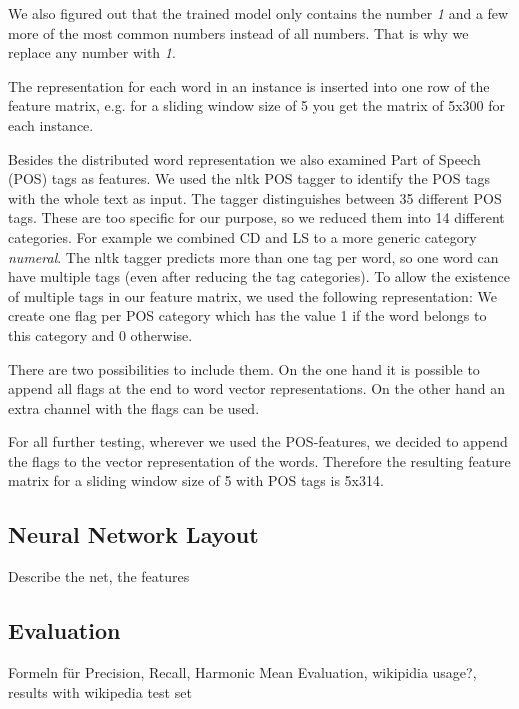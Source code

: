 We also figured out that the trained model only contains the number \emph{1} and a few more of the most common numbers instead of all numbers. 
That is why we replace any number with \emph{1}.

The representation for each word in an instance is inserted into one row of the feature matrix, e.g. for a sliding window size of 5 you get the matrix of 5x300 for each instance.

Besides the distributed word representation we also examined Part of Speech (POS) tags as features.
We used the nltk POS tagger to identify the POS tags with the whole text as input.
The tagger distinguishes between 35 different POS tags.
These are too specific for our purpose, so we reduced them into 14 different categories.
For example we combined CD and LS to a more generic category \emph{numeral}.
The nltk tagger predicts more than one tag per word, so one word can have multiple tags (even after reducing the tag categories).
To allow the existence of multiple tags in our feature matrix, we used the following representation:
We create one flag per POS category which has the value 1 if the word belongs to this category and 0 otherwise.

There are two possibilities to include them.
On the one hand it is possible to append all flags at the end to word vector representations.
On the other hand an extra channel with the flags can be used.

For all further testing, wherever we used the POS-features, we decided to append the flags to the vector representation of the words.
Therefore the resulting feature matrix for a sliding window size of 5 with POS tags is 5x314.



\subsection{Neural Network Layout}
Describe the net, the features

\subsection{Evaluation}
Formeln für Precision, Recall, Harmonic Mean
Evaluation, wikipidia usage?, results with wikipedia test set

